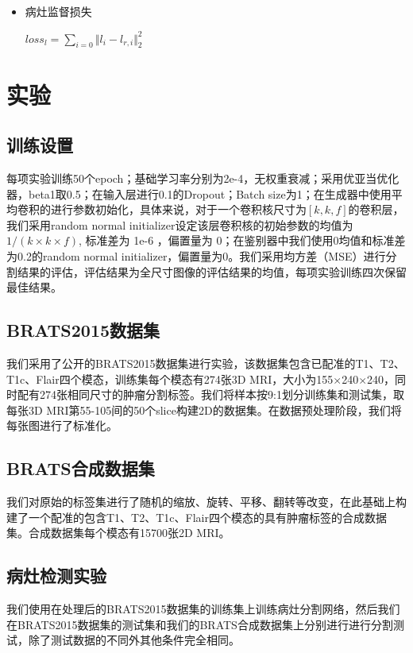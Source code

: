\documentclass[letterpaper]{article} %
\begin{document}
\begin{itemize}
	\item 病灶监督损失
	
	\begin{center}
		$loss_{l}=\sum\limits_{i=0}\Vert{l_i-l_{r,i}}\Vert_{2}^{2}$
	\end{center}
	
\end{itemize}

\section{实验}
\subsection{训练设置}
每项实验训练50个epoch；基础学习率分别为2e-4，无权重衰减；采用优亚当优化器，beta1取0.5；在输入层进行0.1的Dropout；Batch size为1；在生成器中使用平均卷积的进行参数初始化，具体来说，对于一个卷积核尺寸为$[k,k,f]$的卷积层，我们采用random normal initializer设定该层卷积核的初始参数的均值为$1/(k\times k\times f)$, 标准差为 1e-6 ，偏置量为 0；在鉴别器中我们使用0均值和标准差为0.2的random normal initializer，偏置量为0。我们采用均方差（MSE）进行分割结果的评估，评估结果为全尺寸图像的评估结果的均值，每项实验训练四次保留最佳结果。

\subsection{BRATS2015数据集}
我们采用了公开的BRATS2015数据集进行实验，该数据集包含已配准的T1、T2、T1c、Flair四个模态，训练集每个模态有274张3D MRI，大小为155$\times$240$\times$240，同时配有274张相同尺寸的肿瘤分割标签。我们将样本按9:1划分训练集和测试集，取每张3D MRI第55-105间的50个slice构建2D的数据集。在数据预处理阶段，我们将每张图进行了标准化。

\subsection{BRATS合成数据集}
我们对原始的标签集进行了随机的缩放、旋转、平移、翻转等改变，在此基础上构建了一个配准的包含T1、T2、T1c、Flair四个模态的具有肿瘤标签的合成数据集。合成数据集每个模态有15700张2D MRI。

\subsection{病灶检测实验}
我们使用在处理后的BRATS2015数据集的训练集上训练病灶分割网络，然后我们在BRATS2015数据集的测试集和我们的BRATS合成数据集上分别进行进行分割测试，除了测试数据的不同外其他条件完全相同。
\end{document}
